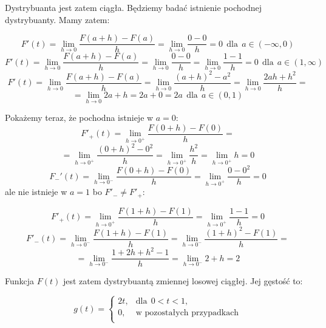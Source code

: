 \documentclass{article}
\begin{document}
Dystrybuanta jest zatem ciągła. Będziemy badać istnienie pochodnej dystrybuanty. Mamy zatem:

\begin{equation*}
    F'(t) = \lim_{h \to 0} \frac{F(a + h) - F(a)}{h}  = \lim_{h \to 0} \frac{0 - 0}{h} = 0 \ \ \text{dla} \ \ a \in (- \infty, 0)
\end{equation*}
\begin{equation*}
    F'(t) = \lim_{h \to 0} \frac{F(a + h) - F(a)}{h}  = \lim_{h \to 0} \frac{0 - 0}{h} = \lim_{h \to 0} \frac{1 - 1}{h} = 0 \ \ \text{dla} \ \ a \in (1, \infty)
\end{equation*}
\begin{equation*}
    F'(t) = \lim_{h \to 0} \frac{F(a + h) - F(a)}{h} = \lim_{h \to 0} \frac{(a + h)^{2} - a^2}{h} = \lim_{h \to 0} \frac{2ah + h^2}{h} = 
\end{equation*}
\begin{equation*}
    = \lim_{h \to 0} 2a + h = 2a + 0 = 2a \ \ \text{dla} \ \ a \in (0, 1)
\end{equation*}

Pokażemy teraz, że pochodna istnieje w \(a = 0\):
\begin{equation*}
    F'_{+}(t) = \lim_{h \to 0^{+}} \frac{F(0 + h) - F(0)}{h} = 
\end{equation*}
\begin{equation*}
    = \lim_{h \to 0^{+}} \frac{(0 + h)^{2} - 0^2}{h} = \lim_{h \to 0^{+}} \frac{h^2}{h} = \lim_{h \to 0^{+}} h = 0
\end{equation*}
\begin{equation*}
    F_{-}'(t) = \lim_{h \to 0^{-}} \frac{F(0 + h) - F(0)}{h} =  \lim_{h \to 0^{+}} \frac{0 - 0^2}{h} = 0
\end{equation*}
ale nie istnieje w \(a = 1\) bo \(F'_{-} \neq F'_{+}\):

\begin{equation*}
    F'_{+}(t) = \lim_{h \to 0^{+}} \frac{F(1 + h) - F(1)}{h} = \lim_{h \to 0^{+}} \frac{1 - 1}{h} = 0
\end{equation*}
\begin{equation*}
    F'_{-}(t) = \lim_{h \to 0^{-}} \frac{F(1 + h) - F(1)}{h} = \lim_{h \to 0^{-}} \frac{(1 + h)^{2} - F(1)}{h} = 
\end{equation*}
\begin{equation*}
    = \lim_{h \to 0^{-}} \frac{1 + 2h + h^2 - 1}{h} = \lim_{h \to 0^{-}} 2 + h = 2
\end{equation*}

Funkcja \(F(t)\) jest zatem dystrybuantą zmiennej losowej ciągłej. Jej gęstość to:

\begin{equation*}
    g(t) = 
        \begin{cases}
            2t, & \text{dla} \ \   0 < t < 1,\\
            0, & \text{w pozostałych przypadkach} \\
        \end{cases}
\end{equation*}
\end{document}
